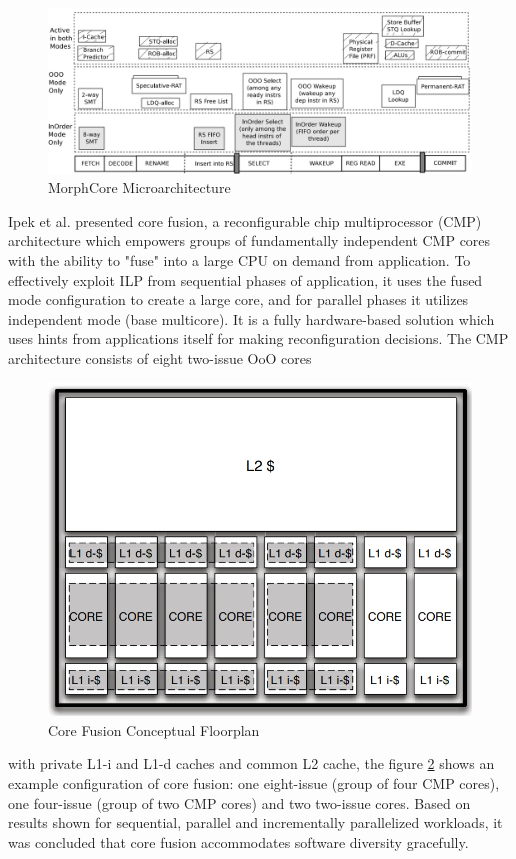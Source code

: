 \documentclass[a4paper,12pt, final]{report}
\begin{document}
\begin{figure}[H]
    \centering
    \includegraphics[width=\linewidth]{morph-uarch.png}
    \caption{MorphCore Microarchitecture}
    \label{morph-arch}
\end{figure}
\indent Ipek et al. \cite{ipek2007core} presented core fusion, a reconfigurable chip multiprocessor (CMP) architecture which empowers groups of fundamentally independent CMP cores with the ability to "fuse" into a large CPU on demand from application. To effectively exploit ILP from sequential phases of application, it uses the fused mode configuration to create a large core, and for parallel phases it utilizes independent mode (base multicore). It is a fully hardware-based solution which uses hints from applications itself for making reconfiguration decisions. The CMP architecture  consists of eight two-issue OoO cores
\begin{figure}[H]
    \centering
    \includegraphics[width=0.5\linewidth]{corefusion-architecture.png}
    \caption{Core Fusion Conceptual Floorplan}
    \label{corefusion-arch}
\end{figure}
\noindent with private L1-i and L1-d caches and common L2 cache, the figure \ref{corefusion-arch} shows an example configuration of core fusion: one eight-issue (group of four CMP cores), one four-issue (group of two CMP cores) and two two-issue cores. Based on results shown for sequential, parallel and incrementally parallelized workloads, it was concluded that core fusion accommodates software diversity gracefully. 
\end{document}
